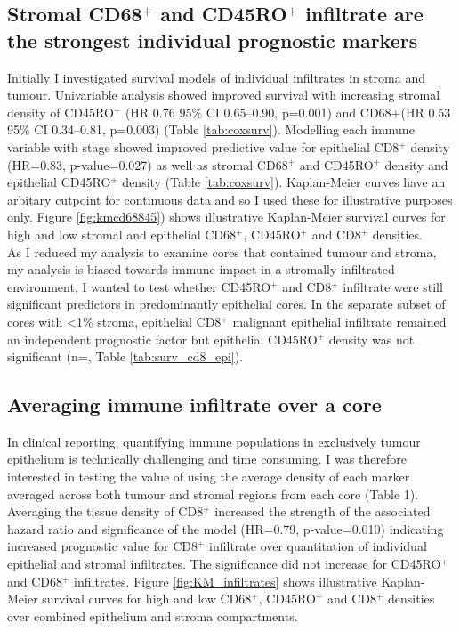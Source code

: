 \subsection[Prognostic value of individual infiltrates]{Stromal CD68$^+$ and CD45RO$^+$ infiltrate are the strongest individual prognostic markers}

Initially I investigated survival models of individual infiltrates in stroma and tumour. Univariable analysis showed improved survival with increasing stromal density of CD45RO$^+$ (HR 0.76 95\% CI 0.65–0.90, p=0.001) and CD68+(HR 0.53 95\% CI 0.34–0.81, p=0.003) (Table \ref{tab:coxsurv}). Modelling each immune variable with stage showed improved predictive value for epithelial CD8$^+$ density (HR=0.83, p-value=0.027) as well as stromal CD68$^+$ and CD45RO$^+$ density and epithelial CD45RO$^+$ density (Table  \ref{tab:coxsurv}). Kaplan-Meier curves have an arbitary cutpoint for continuous data and so I used these for illustrative purposes only. Figure \ref{fig:kmcd68845}) shows illustrative Kaplan-Meier survival curves for high and low stromal and epithelial CD68$^+$, CD45RO$^+$ and CD8$^+$ densities.\\

As I reduced my analysis to examine cores that contained tumour and stroma, my analysis is biased towards immune impact in a stromally infiltrated environment, I wanted to test whether CD45RO$^+$ and CD8$^+$ infiltrate were still significant predictors in predominantly epithelial cores. In the separate subset of cores with <1\% stroma, epithelial CD8$^+$ malignant epithelial infiltrate remained an independent prognostic factor but epithelial CD45RO$^+$ density was not significant (n=, Table \ref{tab:surv_cd8_epi}). %

\subsection{Averaging immune infiltrate over a core}

In clinical reporting, quantifying immune populations in exclusively tumour epithelium is technically challenging and time consuming. I was therefore interested in testing the value of using the average density of each marker averaged across both tumour and stromal regions from each core (Table 1).  Averaging the tissue density of CD8$^+$ increased the strength of the associated hazard ratio and significance of the model (HR=0.79, p-value=0.010) indicating increased prognostic value for CD8$^+$ infiltrate over quantitation of individual epithelial and stromal infiltrates. The significance did not increase for CD45RO$^+$ and CD68$^+$ infiltrates.  Figure \ref{fig:KM_infiltrates} shows illustrative Kaplan-Meier survival curves for high and low CD68$^+$, CD45RO$^+$ and CD8$^+$ densities over combined epithelium and stroma compartments.\\


